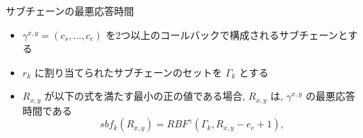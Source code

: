 



\begin{frame}[label=lemma8]{サブチェーンの最悪応答時間}
    \begin{lemma}[サブチェーンの最悪応答時間]
        \begin{itemize}
            \item $\gamma^{x, y}=\left(c_{s}, \ldots, c_{e}\right)$ を2つ以上のコールバックで構成されるサブチェーンとする
            \item $r_{k}$ に割り当てられたサブチェーンのセットを $\Gamma_{k}$ とする
            \item $R_{x, y}$ が以下の式を満たす最小の正の値である場合, $R_{x, y}$ は, $\gamma^{x, y}$ の最悪応答時間である
                  \begin{equation*}
                      s b f_{k}\left(R_{x, y}\right)=R B F^{\gamma}\left(\Gamma_{k}, R_{x, y}-e_{e}+1\right),
                  \end{equation*}
        \end{itemize}
    \end{lemma}
\end{frame}
